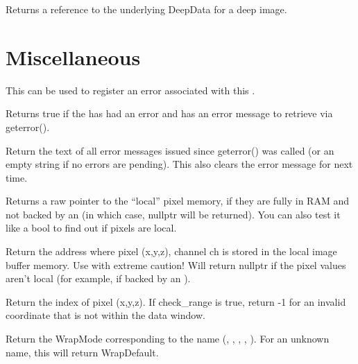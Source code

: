 Returns a reference to the underlying {\cf DeepData} for a deep image.
\apiend


\section{Miscellaneous}

This can be used to register an error associated with this \ImageBuf.
\apiend

Returns {\cf true} if the \ImageBuf has had an error and has an error
message to retrieve via {\cf geterror()}.
\apiend

Return the text of all error messages issued since {\cf geterror()} was
called (or an empty string if no errors are pending).  This also
clears the error message for next time.
\apiend

Returns a raw pointer to the ``local'' pixel memory, if they are fully
in RAM and not backed by an \ImageCache (in which case, {\cf nullptr} will
be returned).  You can also test it like a {\cf bool} to find out if
pixels are local.
\apiend

Return the address where pixel {\cf (x,y,z)}, channel {\cf ch} is stored in
the local image buffer memory.
Use with extreme caution!  Will return {\cf nullptr} if the pixel values
aren't local (for example, if backed by an \ImageCache).
\apiend

Return the index of pixel (x,y,z). If {\cf check_range} is {\cf true},
return -1 for an invalid coordinate that is not within the data window.
\apiend

Return the {\cf WrapMode} corresponding to the name (,
, , , ). For an unknown
name, this will return {\cf WrapDefault}.
\apiend



